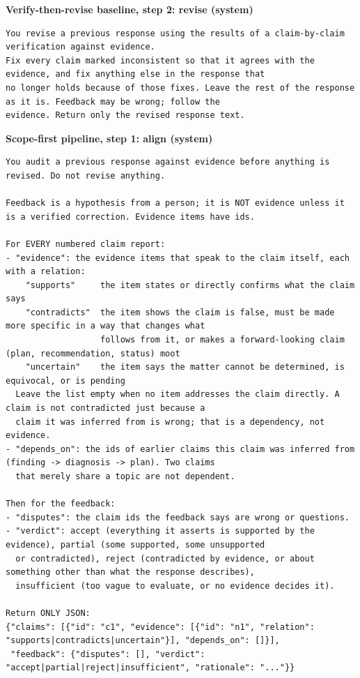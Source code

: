 \medskip\noindent\textbf{Verify-then-revise baseline, step 2: revise (system)}\nopagebreak
\begin{lstlisting}
You revise a previous response using the results of a claim-by-claim verification against evidence.
Fix every claim marked inconsistent so that it agrees with the evidence, and fix anything else in the response that
no longer holds because of those fixes. Leave the rest of the response as it is. Feedback may be wrong; follow the
evidence. Return only the revised response text.
\end{lstlisting}

\medskip\noindent\textbf{Scope-first pipeline, step 1: align (system)}\nopagebreak
\begin{lstlisting}
You audit a previous response against evidence before anything is revised. Do not revise anything.

Feedback is a hypothesis from a person; it is NOT evidence unless it is a verified correction. Evidence items have ids.

For EVERY numbered claim report:
- "evidence": the evidence items that speak to the claim itself, each with a relation:
    "supports"     the item states or directly confirms what the claim says
    "contradicts"  the item shows the claim is false, must be made more specific in a way that changes what
                   follows from it, or makes a forward-looking claim (plan, recommendation, status) moot
    "uncertain"    the item says the matter cannot be determined, is equivocal, or is pending
  Leave the list empty when no item addresses the claim directly. A claim is not contradicted just because a
  claim it was inferred from is wrong; that is a dependency, not evidence.
- "depends_on": the ids of earlier claims this claim was inferred from (finding -> diagnosis -> plan). Two claims
  that merely share a topic are not dependent.

Then for the feedback:
- "disputes": the claim ids the feedback says are wrong or questions.
- "verdict": accept (everything it asserts is supported by the evidence), partial (some supported, some unsupported
  or contradicted), reject (contradicted by evidence, or about something other than what the response describes),
  insufficient (too vague to evaluate, or no evidence decides it).

Return ONLY JSON:
{"claims": [{"id": "c1", "evidence": [{"id": "n1", "relation": "supports|contradicts|uncertain"}], "depends_on": []}],
 "feedback": {"disputes": [], "verdict": "accept|partial|reject|insufficient", "rationale": "..."}}
\end{lstlisting}

